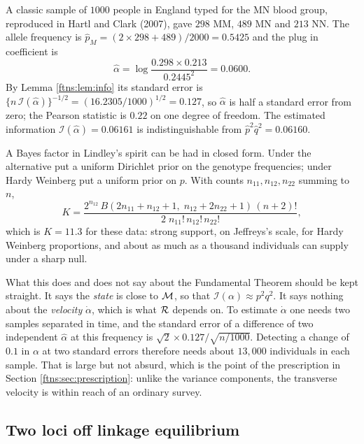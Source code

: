 \begin{example}
\label{ftns:ex:mn}
A classic sample of $1000$ people in England typed for the MN blood group, reproduced in Hartl and
Clark (2007), gave $298$ MM, $489$ MN and $213$ NN. The allele frequency is
$\hat p_M=(2\times298+489)/2000=0.5425$ and the plug in coefficient is
\[
\hat\alpha=\log\frac{0.298\times0.213}{0.2445^2}=0.0600 .
\]
By Lemma \ref{ftns:lem:info} its standard error is
$\{n\,\mathcal{I}(\hat\alpha)\}^{-1/2}=(16.2305/1000)^{1/2}=0.127$, so $\hat\alpha$ is half a
standard error from zero; the Pearson statistic is $0.22$ on one degree of freedom. The estimated
information $\mathcal{I}(\hat\alpha)=0.06161$ is indistinguishable from
$\hat p^2\hat q^2=0.06160$.

A Bayes factor in Lindley's spirit can be had in closed form. Under the alternative put a uniform
Dirichlet prior on the genotype frequencies; under Hardy Weinberg put a uniform prior on $p$. With
counts $n_{11},n_{12},n_{22}$ summing to $n$,
\[
K=\frac{2^{n_{12}}\,B(2n_{11}+n_{12}+1,\;n_{12}+2n_{22}+1)\,(n+2)!}{2\;n_{11}!\,n_{12}!\,n_{22}!},
\]
which is $K=11.3$ for these data: strong support, on Jeffreys's scale, for Hardy Weinberg proportions, and about as
much as a thousand individuals can supply under a sharp null.

What this does and does not say about the Fundamental Theorem should be kept straight. It says the
\emph{state} is close to $\mathcal{M}$, so that $\mathcal{I}(\alpha)\approx p^2q^2$. It says nothing about
the \emph{velocity} $\dot\alpha$, which is what $\mathcal{R}$ depends on. To estimate $\dot\alpha$ one needs
two samples separated in time, and the standard error of a difference of two independent
$\hat\alpha$ at this frequency is $\sqrt2\times0.127/\sqrt{n/1000}$. Detecting a change of $0.1$ in
$\alpha$ at two standard errors therefore needs about $13{,}000$ individuals in each sample. That
is large but not absurd, which is the point of the prescription in
Section \ref{ftns:sec:prescription}: unlike the variance components, the transverse velocity is
within reach of an ordinary survey.
\end{example}

\subsection{Two loci off linkage equilibrium}
\label{ftns:sec:twolocusex}

